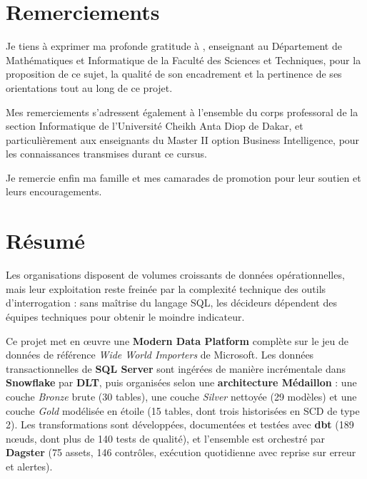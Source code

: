 \chapter*{Remerciements}

Je tiens à exprimer ma profonde gratitude à \textbf{\encadrant}, enseignant au Département de
Mathématiques et Informatique de la Faculté des Sciences et Techniques, pour la proposition de ce
sujet, la qualité de son encadrement et la pertinence de ses orientations tout au long de ce projet.

Mes remerciements s'adressent également à l'ensemble du corps professoral de la section Informatique
de l'Université Cheikh Anta Diop de Dakar, et particulièrement aux enseignants du Master II option
Business Intelligence, pour les connaissances transmises durant ce cursus.

Je remercie enfin ma famille et mes camarades de promotion pour leur soutien et leurs encouragements.

\chapter*{Résumé}

Les organisations disposent de volumes croissants de données opérationnelles, mais leur exploitation
reste freinée par la complexité technique des outils d'interrogation : sans maîtrise du langage SQL, les
décideurs dépendent des équipes techniques pour obtenir le moindre indicateur.

Ce projet met en œuvre une \textbf{Modern Data Platform} complète sur le jeu de données de référence
\emph{Wide World Importers} de Microsoft. Les données transactionnelles de \textbf{SQL Server} sont
ingérées de manière incrémentale dans \textbf{Snowflake} par \textbf{DLT}, puis organisées selon une
\textbf{architecture Médaillon} : une couche \emph{Bronze} brute (30 tables), une couche \emph{Silver}
nettoyée (29 modèles) et une couche \emph{Gold} modélisée en étoile (15 tables, dont trois historisées
en SCD de type 2). Les transformations sont développées, documentées et testées avec \textbf{dbt}
(189 nœuds, dont plus de 140 tests de qualité), et l'ensemble est orchestré par \textbf{Dagster}
(75 assets, 146 contrôles, exécution quotidienne avec reprise sur erreur et alertes).

